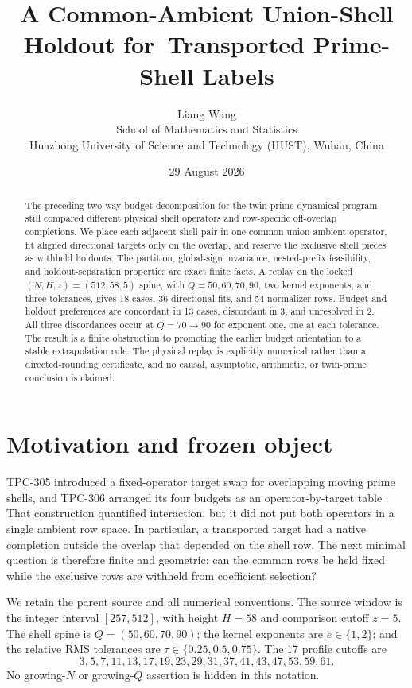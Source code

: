 \documentclass[11pt]{article}
\title{A Common-Ambient Union-Shell Holdout for\
Transported Prime-Shell Labels}
\author{Liang Wang\\
School of Mathematics and Statistics\\
Huazhong University of Science and Technology (HUST), Wuhan, China}
\date{29 August 2026}
\begin{document}
\maketitle

\begin{abstract}
The preceding two-way budget decomposition for the twin-prime dynamical
program still compared different physical shell operators and row-specific
off-overlap completions.  We place each adjacent shell pair in one common
union ambient operator, fit aligned directional targets only on the overlap,
and reserve the exclusive shell pieces as withheld holdouts.  The partition,
global-sign invariance, nested-prefix feasibility, and holdout-separation
properties are exact finite facts.  A replay on the locked
$(N,H,z)=(512,58,5)$ spine, with $Q=50,60,70,90$, two kernel exponents, and
three tolerances, gives 18 cases, 36 directional fits, and 54 normalizer rows.
Budget and holdout preferences are concordant in 13 cases, discordant in 3,
and unresolved in 2.  All three discordances occur at $Q=70\to90$ for
exponent one, one at each tolerance.  The result is a finite obstruction to
promoting the earlier budget orientation to a stable extrapolation rule.  The
physical replay is explicitly numerical rather than a directed-rounding
certificate, and no causal, asymptotic, arithmetic, or twin-prime conclusion
is claimed.
\end{abstract}

\section{Motivation and frozen object}

TPC-305 introduced a fixed-operator target swap for overlapping moving prime
shells, and TPC-306 arranged its four budgets as an operator-by-target table
\cite{tpc305,tpc306}.  That construction quantified interaction, but it did
not put both operators in a single ambient row space.  In particular, a
transported target had a native completion outside the overlap that depended
on the shell row.  The next minimal question is therefore finite and
geometric: can the common rows be held fixed while the exclusive rows are
withheld from coefficient selection?

We retain the parent source and all numerical conventions.  The source window
is the integer interval $[257,512]$, with height $H=58$ and comparison cutoff
$z=5$.  The shell spine is $Q=(50,60,70,90)$; the kernel exponents are
$e\in\{1,2\}$; and the relative RMS tolerances are
$\tau\in\{0.25,0.5,0.75\}$.  The 17 profile cutoffs are
\[
  3,5,7,11,13,17,19,23,29,31,37,41,43,47,53,59,61.
\]
No growing-$N$ or growing-$Q$ assertion is hidden in this notation.
\end{document}
